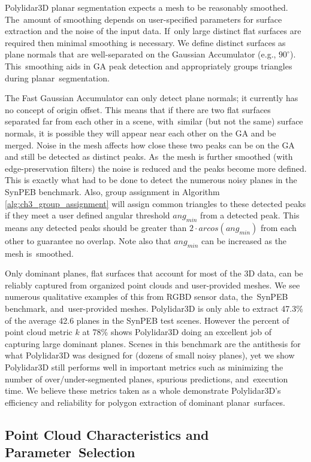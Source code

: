 Polylidar3D planar segmentation expects a mesh to be reasonably smoothed. The~amount of smoothing depends on user-specified parameters for surface extraction and the noise of the input data. If~only large distinct flat surfaces are required then minimal smoothing is necessary. We define distinct surfaces as plane normals that are well-separated on the Gaussian Accumulator (e.g., $90^\circ$). This~smoothing aids in GA peak detection and appropriately groups triangles during planar~segmentation. 

The Fast Gaussian Accumulator can only detect plane normals; it currently has no concept of origin offset.  This means that if there are two flat surfaces separated far from each other in a scene, with~similar (but not the same) surface normals, it is possible they will appear near each other on the GA and be merged. Noise in the mesh affects how close these two peaks can be on the GA and still be detected as distinct peaks. As~the mesh is further smoothed (with edge-preservation filters) the noise is reduced and the peaks become more defined. This is exactly what had to be done to detect the numerous noisy planes in the SynPEB benchmark. Also, group assignment in Algorithm \ref{alg:ch3_group_assignment} will assign common triangles to these detected peaks if they meet a user defined angular threshold $ang_{min}$ from a detected peak. This means any detected peaks should be greater than $2\cdot arcos(ang_{min})$ from each other to guarantee no overlap. Note also that $ang_{min}$ can be increased as the mesh is~smoothed.

Only dominant planes, flat surfaces that account for most of the 3D data, can be reliably captured from organized point clouds and user-provided meshes. We see numerous qualitative examples of this from \ac{RGBD} sensor data, the~SynPEB benchmark, and~user-provided meshes. Polylidar3D is only able to extract 47.3\% of the average 42.6 planes in the SynPEB test scenes. However the percent of point cloud metric $k$ at 78\% shows Polylidar3D doing an excellent job of capturing large dominant planes.  Scenes in this benchmark are the antithesis for what Polylidar3D was designed for (dozens of small noisy planes), yet we show Polylidar3D still performs well in important metrics such as minimizing the number of over/under-segmented planes, spurious predictions, and~execution time. We believe these metrics taken as a whole demonstrate Polylidar3D's efficiency and reliability for polygon extraction of dominant planar~surfaces.

\subsection{Point Cloud Characteristics and Parameter~Selection}

